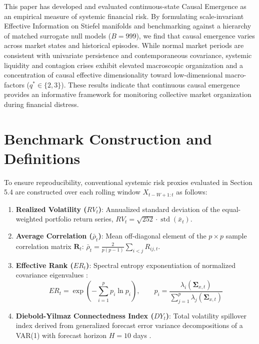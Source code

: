 \documentclass[review,12pt,authoryear]{elsarticle}
\begin{document}
This paper has developed and evaluated continuous-state Causal Emergence as an empirical measure of systemic financial risk. By formulating scale-invariant Effective Information on Stiefel manifolds and benchmarking against a hierarchy of matched surrogate null models ($B=999$), we find that causal emergence varies across market states and historical episodes. While normal market periods are consistent with univariate persistence and contemporaneous covariance, systemic liquidity and contagion crises exhibit elevated macroscopic organization and a concentration of causal effective dimensionality toward low-dimensional macro-factors ($q^* \in \{2, 3\}$). These results indicate that continuous causal emergence provides an informative framework for monitoring collective market organization during financial distress.

\appendix

\section{Benchmark Construction and Definitions}
\label{app:benchmarks}
To ensure reproducibility, conventional systemic risk proxies evaluated in Section 5.4 are constructed over each rolling window $X_{t-W+1:t}$ as follows:
\begin{enumerate}
    \item \textbf{Realized Volatility ($RV_t$)}: Annualized standard deviation of the equal-weighted portfolio return series, $RV_t = \sqrt{252} \cdot \operatorname{std}(\bar{x}_t)$.
    \item \textbf{Average Correlation ($\bar{\rho}_t$)}: Mean off-diagonal element of the $p \times p$ sample correlation matrix $\mathbf{R}_t$: $\bar{\rho}_t = \frac{2}{p(p-1)} \sum_{i < j} R_{ij,t}$.
    \item \textbf{Effective Rank ($ER_t$)}: Spectral entropy exponentiation of normalized covariance eigenvalues \citep{roy2007effective}:
    \begin{equation}
    ER_t = \exp\left( -\sum_{i=1}^p p_i \ln p_i \right), \qquad p_i = \frac{\lambda_i(\boldsymbol{\Sigma}_{x,t})}{\sum_{j=1}^p \lambda_j(\boldsymbol{\Sigma}_{x,t})}
    \end{equation}
    \item \textbf{Diebold-Yilmaz Connectedness Index ($DY_t$)}: Total volatility spillover index derived from generalized forecast error variance decompositions of a VAR(1) with forecast horizon $H = 10$ days \citep{diebold2012better}.
\end{enumerate}
\end{document}
